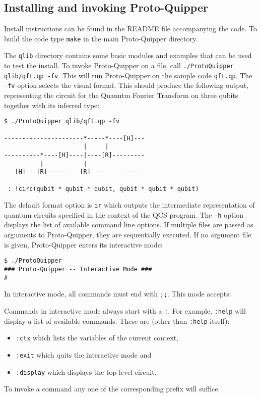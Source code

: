 \subsection{Installing and invoking Proto-Quipper}

Install instructions can be found in the README file accompanying the code. 
To build the code type \verb#make# in the main Proto-Quipper directory. 

The \verb#qlib# directory contains some basic modules and examples that can 
be used to test the install. To invoke Proto-Quipper on a file, call 
\verb#./ProtoQuipper qlib/qft.qp -fv#. This will run Proto-Quipper on the sample code \verb#qft.qp#. The \verb#-fv# option selects the visual format. 
This should produce the following output, representing the circuit for the 
Quanutm Fourier Transform on three qubits together with its inferred 
type:
\begin{verbatim}
$ ./ProtoQuipper qlib/qft.qp -fv

----------------------*-----*----[H]---
                      |     |          
----------*----[H]----|----[R]---------
          |           |                
---[H]---[R]---------[R]---------------

 : !circ(qubit * qubit * qubit, qubit * qubit * qubit)
\end{verbatim}
The default format option is \verb#ir# which outputs the intermediate representation of quantum circuits specified in the context of the QCS program. The \verb#-h# option displays the list of available command line 
options. If multiple files are passed as arguments to Proto-Quipper, they 
are sequentially executed. If no argument file is given, Proto-Quipper 
enters its interactive mode:
\begin{verbatim}
$ ./ProtoQuipper
### Proto-Quipper -- Interactive Mode ###
# 
\end{verbatim}
In interactive mode, all commands must end with \verb#;;#. This mode accepts:
Commands in interactive mode always start with a \verb#:#. For example, 
\verb#:help# will display a list of available commands. These are (other 
than \verb#:help# itself): 
\begin{itemize}
  \item \verb#:ctx# which lists the variables of the current context, 
  \item \verb#:exit# which quits the interactive mode and
  \item \verb#:display# which displays the top-level circuit.
\end{itemize}
To invoke a command any one of the corresponding prefix will suffice.


